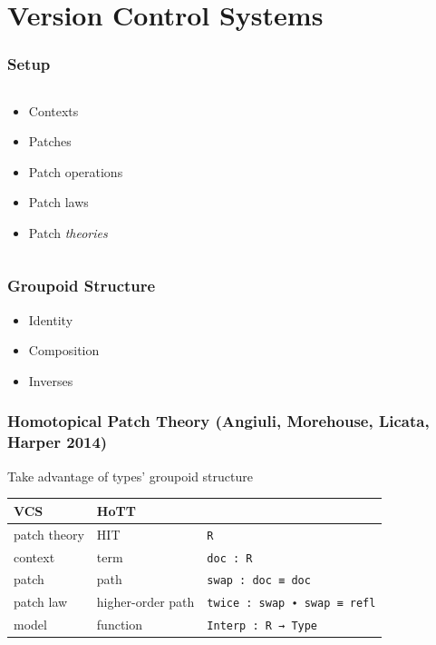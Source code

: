 \documentclass{beamer}
\begin{document}
\section{Version Control Systems}
\begin{frame}[fragile]
  \frametitle{Setup}
  \begin{columns}
  \begin{column}{.5\textwidth}
  \begin{itemize}
    \item Contexts
    \item Patches
    \item Patch operations
    \item Patch laws
    \item Patch \emph{theories}
  \end{itemize}
  \end{column}
  \begin{column}{.5\textwidth}
\end{column}
\end{columns}
\end{frame}

\begin{frame}
  \frametitle{Groupoid Structure}
  \begin{itemize}
  \item Identity
  \item Composition
  \item Inverses
  \end{itemize}
\end{frame}

\begin{frame}
  \frametitle{Homotopical Patch Theory (Angiuli, Morehouse, Licata, Harper 2014)}
  Take advantage of types' groupoid structure
  \vfill{}
  \begin{tabular}{l | l | l}
    VCS & HoTT &\\
    \hline
    patch theory & HIT & \texttt{R} \\
    context & term & \texttt{doc : R} \\
    patch & path & \texttt{swap : doc ≡ doc} \\
    patch law & higher-order path & \texttt{twice : swap ∙ swap ≡ refl} \\
    model & function & \texttt{Interp : R → Type}
  \end{tabular}
\end{frame}
\end{document}
